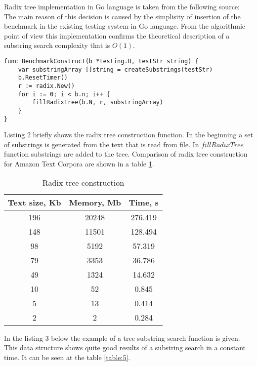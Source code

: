 Radix tree implementation in Go language is taken from the following source: \cite{golang2016sa}
The main reason of this decision is caused by the simplisity of insertion of the benchmark
in the existing testing system in Go language.
From the algorithmic point of view this implementation confirms the theoretical description of
a substring search complexity that is $O(1)$.

\newpage
\begin{lstlisting}[caption=Radix tree example]
func BenchmarkConstruct(b *testing.B, testStr string) {
	var substringArray []string = createSubstrings(testStr)
	b.ResetTimer()
	r := radix.New()
	for i := 0; i < b.n; i++ {
		fillRadixTree(b.N, r, substringArray)
	}
}
\end{lstlisting}

Listing 2 briefly shows the radix tree construction function.
In the beginning a set of substrings is generated from the text that is read from file.
In $fillRadixTree$ function substrings are added to the tree. Comparison of
radix tree construction for Amazon Text Corpora \cite{amazon2013text} are shown in a table \ref{table:4}.


\begin{table}[ht!]
    \centering
    \begin{tabular}{|c|c|c|}
        \hline
        Text size, Kb & Memory, Mb & Time, s\\
        \hline
        196 & 20248 & 276.419\\
        \hline
        148 & 11501 & 128.494\\
        \hline
        98 & 5192 & 57.319\\
        \hline
        79 & 3353 & 36.786\\
        \hline
        49 & 1324 & 14.632\\
        \hline
        10 & 52 & 0.845\\
        \hline
        5 & 13 & 0.414\\
        \hline
        2 & 2 & 0.284\\
        \hline
    \end{tabular}
    \caption{Radix tree construction}
    \label{table:4}
\end{table}

In the listing 3 below the example of a tree substring search function is given.
This data structure shows quite good results of a substring search in a constant time.
It can be seen at the table \ref{table:5}.

